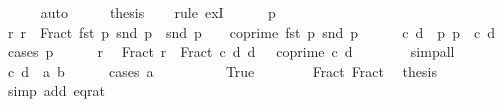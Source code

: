 \begin{isabellebody}
\ \ \ \ \isamarkupfalse%
\ auto\isanewline
\ \ \isamarkupfalse%
\ \isamarkupfalse%
\ {\isacharquery}{\kern0pt}thesis\isanewline
\ \ \isamarkupfalse%
\ {\isacharparenleft}{\kern0pt}rule\ ex{}I{\isacharparenright}{\kern0pt}\isanewline
\ \ \ \ \isamarkupfalse%
\ p\isanewline
\ \ \ \ \isamarkupfalse%
\ r{\isacharcolon}{\kern0pt}\ {\isachardoublequoteopen}r\ {\isacharequal}{\kern0pt}\ Fract\ {\isacharparenleft}{\kern0pt}fst\ p{\isacharparenright}{\kern0pt}\ {\isacharparenleft}{\kern0pt}snd\ p{\isacharparenright}{\kern0pt}\ {\isasymand}\ snd\ p\ {\isachargreater}{\kern0pt}\ {}\ {\isasymand}\ coprime\ {\isacharparenleft}{\kern0pt}fst\ p{\isacharparenright}{\kern0pt}\ {\isacharparenleft}{\kern0pt}snd\ p{\isacharparenright}{\kern0pt}{\isachardoublequoteclose}\isanewline
\ \ \ \ \isamarkupfalse%
\ c\ d\ \ p{\isacharcolon}{\kern0pt}\ {\isachardoublequoteopen}p\ {\isacharequal}{\kern0pt}\ {\isacharparenleft}{\kern0pt}c{\isacharcomma}{\kern0pt}\ d{\isacharparenright}{\kern0pt}{\isachardoublequoteclose}\ \isamarkupfalse%
\ {\isacharparenleft}{\kern0pt}cases\ p{\isacharparenright}{\kern0pt}\isanewline
\ \ \ \ \isamarkupfalse%
\ r\ \isamarkupfalse%
\ Fract{\isacharprime}{\kern0pt}{\isacharcolon}{\kern0pt}\ {\isachardoublequoteopen}r\ {\isacharequal}{\kern0pt}\ Fract\ c\ d{\isachardoublequoteclose}\ {\isachardoublequoteopen}d\ {\isachargreater}{\kern0pt}\ {}{\isachardoublequoteclose}\ {\isachardoublequoteopen}coprime\ c\ d{\isachardoublequoteclose}\isanewline
\ \ \ \ \ \ \isamarkupfalse%
\ simp{\isacharunderscore}{\kern0pt}all\isanewline
\ \ \ \ \isamarkupfalse%
\ {\isachardoublequoteopen}{\isacharparenleft}{\kern0pt}c{\isacharcomma}{\kern0pt}\ d{\isacharparenright}{\kern0pt}\ {\isacharequal}{\kern0pt}\ {\isacharparenleft}{\kern0pt}a{\isacharcomma}{\kern0pt}\ b{\isacharparenright}{\kern0pt}{\isachardoublequoteclose}\isanewline
\ \ \ \ \isamarkupfalse%
\ {\isacharparenleft}{\kern0pt}cases\ {\isachardoublequoteopen}a\ {\isacharequal}{\kern0pt}\ {}{\isachardoublequoteclose}{\isacharparenright}{\kern0pt}\isanewline
\ \ \ \ \ \ \isamarkupfalse%
\ True\isanewline
\ \ \ \ \ \ \isamarkupfalse%
\ Fract\ Fract{\isacharprime}{\kern0pt}\ \isamarkupfalse%
\ {\isacharquery}{\kern0pt}thesis\isanewline
\ \ \ \ \ \ \ \ \isamarkupfalse%
\ {\isacharparenleft}{\kern0pt}simp\ add{\isacharcolon}{\kern0pt}\ eq{\isacharunderscore}{\kern0pt}rat{\isacharparenright}{\kern0pt}\isanewline

\end{isabellebody}
